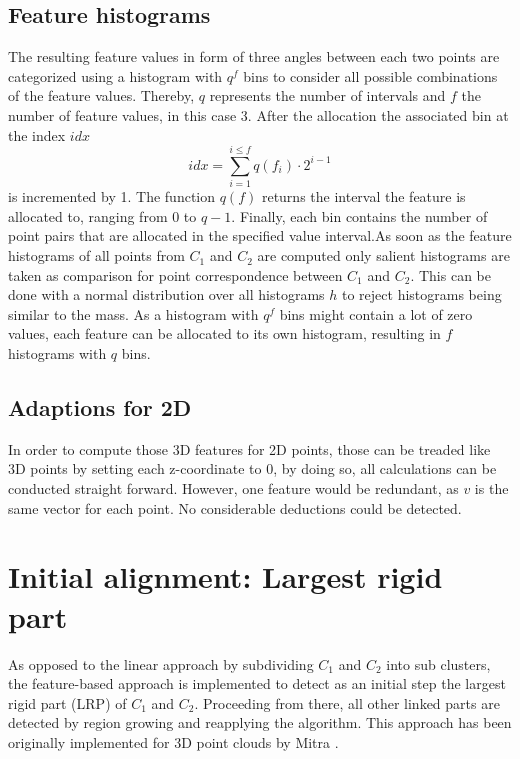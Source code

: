 \subsection{Feature histograms}
The resulting feature values in form of three angles between each two points are categorized using a histogram with $q^f$ bins to consider all possible combinations of the feature values. Thereby, $q$ represents the number of intervals and $f$ the number of feature values, in this case 3. After the allocation the associated bin at the index $idx$
\begin{equation}
idx = \displaystyle\sum_{i=1}^{i \leq f}q(f_i) \cdot 2^{i-1}
\end{equation}
is incremented by 1. The function $q(f)$ returns the interval the feature is allocated to, ranging from 0 to $q - 1$. Finally, each bin contains the number of point pairs that are allocated in the specified value interval.As soon as the feature histograms of all points from $C_1$ and $C_2$ are computed only salient histograms are taken as comparison for point correspondence between $C_1$ and $C_2$. This can be done with a normal distribution over all histograms $h$ to reject histograms being similar to the mass. As a histogram with $q^f$ bins might contain a lot of zero values, each feature can be allocated to its own histogram, resulting in $f$ histograms with $q$ bins.

\subsection{Adaptions for 2D}
In order to compute those 3D features for 2D points, those can be treaded like 3D points by setting each z-coordinate to 0, by doing so, all calculations can be conducted straight forward. However, one feature would be redundant, as $v$ is the same vector for each point. No considerable deductions could be detected. 


\section{Initial alignment: Largest rigid part}
\label{LRP}

As opposed to the linear approach by subdividing $C_1$ and $C_2$ into sub clusters, the feature-based approach is implemented to detect as an initial step the largest rigid part (LRP) of $C_1$ and $C_2$. Proceeding from there, all other linked parts are detected by region growing and reapplying the algorithm. This approach has been originally implemented for 3D point clouds by Mitra \cite{Mitra07}.

